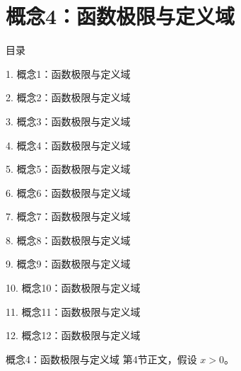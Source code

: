 \documentclass[aspectratio=169,10pt,fontset=fandol]{ctexbeamer}
\begin{document}
\section{概念4：函数极限与定义域}
\begin{frame}[t,fragile]{目录}
\small
{\color{black}\small 1. 概念1：函数极限与定义域\par}\vspace{0.22em}
{\color{black}\small 2. 概念2：函数极限与定义域\par}\vspace{0.22em}
{\color{black}\small 3. 概念3：函数极限与定义域\par}\vspace{0.22em}
{\color{blue}\small 4. 概念4：函数极限与定义域\par}\vspace{0.22em}
{\color{gray!40}\small 5. 概念5：函数极限与定义域\par}\vspace{0.22em}
{\color{gray!40}\small 6. 概念6：函数极限与定义域\par}\vspace{0.22em}
{\color{gray!40}\small 7. 概念7：函数极限与定义域\par}\vspace{0.22em}
{\color{gray!40}\small 8. 概念8：函数极限与定义域\par}\vspace{0.22em}
{\color{gray!40}\small 9. 概念9：函数极限与定义域\par}\vspace{0.22em}
{\color{gray!40}\small 10. 概念10：函数极限与定义域\par}\vspace{0.22em}
{\color{gray!40}\small 11. 概念11：函数极限与定义域\par}\vspace{0.22em}
{\color{gray!40}\small 12. 概念12：函数极限与定义域\par}\vspace{0.22em}
\end{frame}
\begin{frame}[t,fragile]{概念4：函数极限与定义域}
\normalsize
{\normalsize
第4节正文，假设 $x>0$。
}
\end{frame}
\end{document}
